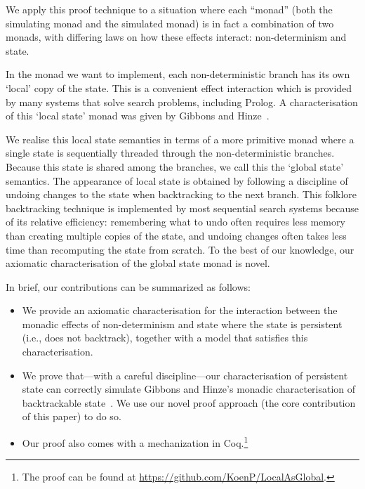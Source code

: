 \documentclass{jfp}
\begin{document}
We apply this proof technique to a situation where
each ``monad'' (both the simulating monad and the simulated monad)
is in fact a combination of two monads, with differing laws on how these effects
interact:
non-determinism and state.

In the monad we want to implement, each
non-deterministic branch has its own `local' copy of the state. This is a
convenient effect interaction which is provided by many systems that solve
search problems, including Prolog.
A characterisation of this `local state' monad was given by Gibbons and
Hinze~\cite{GibbonsHinze:11:Just}.

We realise this local state semantics in terms of a more primitive monad where
a single state is sequentially threaded through the non-deterministic
branches. Because this state is shared among the branches, we call this the
`global state' semantics. The appearance of local state is obtained by
following a discipline of undoing changes to the state when backtracking to the
next branch. This folklore backtracking technique is implemented by most
sequential search systems because of its relative efficiency: remembering what
to undo often requires less memory than creating multiple copies of the state,
and undoing changes often takes less time than recomputing the state from
scratch.
To the best of our knowledge, our axiomatic characterisation of the global state
monad is novel.

In brief, our contributions can be summarized as follows:
\begin{itemize}
\item
  We provide an axiomatic characterisation for the interaction between the
  monadic effects of non-determinism and state where the state is persistent
  (i.e., does not backtrack), together with a model that satisfies this
  characterisation.                                                           
\item
  We prove that---with a careful discipline---our characterisation of
  persistent state can correctly simulate Gibbons and Hinze's
  monadic characterisation of backtrackable state~\cite{GibbonsHinze:11:Just}.
  We use our novel proof approach (the core contribution of this paper) to do so.
\item
  Our proof also comes with a mechanization in Coq.\footnote{The proof can be
    found at \url{https://github.com/KoenP/LocalAsGlobal}.}
\end{itemize}
\end{document}
